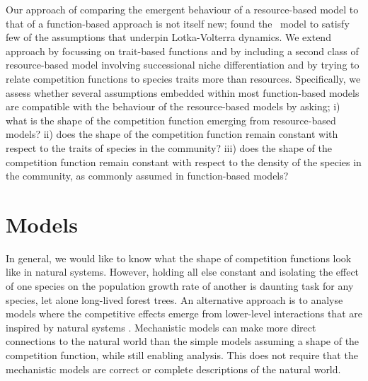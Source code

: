 \documentclass[a4paper,11pt]{article}
\begin{document}
Our approach of comparing the emergent behaviour of a resource-based model to that of a function-based approach is not itself new;
\citet{Abrams-2008} found the \Rstar\ model to satisfy few of the assumptions that underpin Lotka-Volterra dynamics.
We extend \citeauthor{Abrams-2008} approach by focussing on trait-based functions and by including a second class of resource-based model involving successional niche differentiation and by trying to relate competition functions to species traits more than resources.
Specifically, we assess whether several assumptions embedded within most function-based models are compatible with the behaviour of the resource-based models by asking;
i) what is the shape of the competition function emerging from resource-based models?
ii) does the shape of the competition function remain constant with respect to the traits of species in the community?
iii) does the shape of the competition function remain constant with respect to the density of the species in the community, as commonly assumed in function-based models?


\section{Models}

In general, we would like to know what the shape of competition functions look like in natural systems.
However, holding all else constant and isolating the effect of one species on the population growth rate of another is daunting task for any species, let alone long-lived forest trees.
%
An alternative approach is to analyse models where the competitive effects emerge from lower-level interactions that are inspired by natural systems \citep[e.g.,][]{Draghi-2012}.
Mechanistic models can make more direct connections to the natural world than the simple models assuming a shape of the competition function, while still enabling analysis.
This does not require that the mechanistic models are correct or complete descriptions of the natural world.
\end{document}
